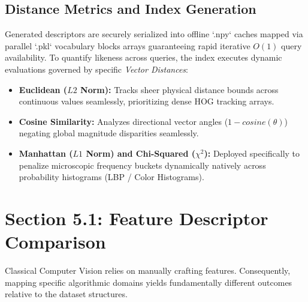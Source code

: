 \documentclass[11pt, a4paper]{article}
\begin{document}
\subsection{Distance Metrics and Index Generation}
Generated descriptors are securely serialized into offline `.npy` caches mapped via parallel `.pkl` vocabulary blocks arrays guaranteeing rapid iterative $O(1)$ query availability. To quantify likeness across queries, the index executes dynamic evaluations governed by specific \textit{Vector Distances}:
\begin{itemize}
    \item \textbf{Euclidean ($L2$ Norm):} Tracks sheer physical distance bounds across continuous values seamlessly, prioritizing dense HOG tracking arrays.
    \item \textbf{Cosine Similarity:} Analyzes directional vector angles ($1 - cosine(\theta)$) negating global magnitude disparities seamlessly.
    \item \textbf{Manhattan ($L1$ Norm) and Chi-Squared ($\chi^2$):} Deployed specifically to penalize microscopic frequency buckets dynamically natively across probability histograms (LBP / Color Histograms).
\end{itemize}

\newpage
\section{Section 5.1: Feature Descriptor Comparison}
Classical Computer Vision relies on manually crafting features. Consequently, mapping specific algorithmic domains yields fundamentally different outcomes relative to the dataset structures.
\end{document}
